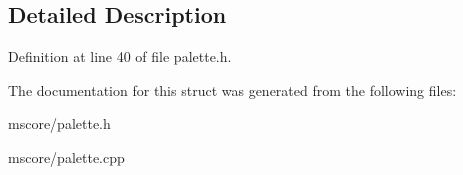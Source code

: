 \subsection{Detailed Description}


Definition at line 40 of file palette.\+h.



The documentation for this struct was generated from the following files\+:\begin{DoxyCompactItemize}
\item 
mscore/palette.\+h\item 
mscore/palette.\+cpp\end{DoxyCompactItemize}
